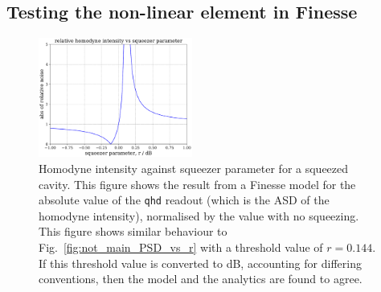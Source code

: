 \documentclass[aps,pra,superscriptaddress,reprint,nofootinbib]{revtex4-1}
\newcommand{\code}[1]{\texttt{#1}}
\begin{document}
\subsection{Testing the non-linear element in Finesse}

\begin{figure}[ht]
	\begin{center}
	\includegraphics[width=0.45\textwidth]{figures/pykat_relative_qhd_vs_r.pdf}
	\end{center}
	\caption{Homodyne intensity against squeezer parameter for a squeezed cavity. This figure shows the result from a Finesse model for the absolute value of the \code{qhd} readout (which is the ASD of the homodyne intensity), normalised by the value with no squeezing. This figure shows similar behaviour to Fig.~\ref{fig:not_main_PSD_vs_r} with a threshold value of $r = 0.144$. If this threshold value is converted to dB, accounting for differing conventions, then the model and the analytics are found to agree.}
	\label{fig:pykat_relative_qhd_vs_r}
\end{figure}
\end{document}
